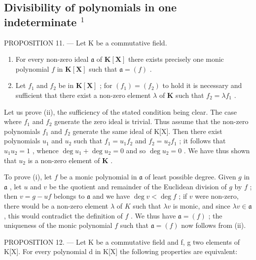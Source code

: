 \subsection{\texorpdfstring{Divisibility of polynomials in one indeterminate \(^{1}\)}{Divisibility of polynomials in one indeterminate [1]}}

PROPOSITION 11. --- Let K be a commutative field.

\begin{enumerate}
\def\labelenumi{(\roman{enumi})}
\item
  For every non-zero ideal \(\mathfrak{a}\) of \(\mathbf{K}[\mathbf{X}]\) there exists precisely one monic polynomial \(f\) in \(\mathbf{K}[\mathbf{X}]\) such that \(\mathfrak{a} = (f)\) .
\item
  Let \(f_{1}\) and \(f_{2}\) be in \(\mathbf{K}[\mathbf{X}]\) ; for \((f_{1}) = (f_{2})\) to hold it is necessary and sufficient that there exist a non-zero element \(\lambda\) of \(\mathbf{K}\) such that \(f_{2} = \lambda f_{1}\) .
\end{enumerate}

Let us prove (ii), the sufficiency of the stated condition being clear. The case where \(f_{1}\) and \(f_{2}\) generate the zero ideal is trivial. Thus assume that the non-zero polynomials \(f_{1}\) and \(f_{2}\) generate the same ideal of K{[}X{]}. Then there exist polynomials \(u_{1}\) and \(u_{2}\) such that \(f_{1}=u_{1}f_{2}\) and \(f_{2}=u_{2}f_{1}\) ; it follows that \(u_{1}u_{2} = 1\) , whence \(\deg u_{1} + \deg u_{2} = 0\) and so \(\deg u_{2} = 0\) . We have thus shown that \(u_{2}\) is a non-zero element of \(\mathbf{K}\) .

To prove (i), let \(f\) be a monic polynomial in \(\mathfrak{a}\) of least possible degree. Given \(g\) in \(\mathfrak{a}\) , let \(u\) and \(v\) be the quotient and remainder of the Euclidean division of \(g\) by \(f\) ; then \(v = g - uf\) belongs to \(\mathfrak{a}\) and we have \(\deg v < \deg f\) ; if \(v\) were non-zero, there would be a non-zero element \(\lambda\) of \(K\) such that \(\lambda v\) is monic, and since \(\lambda v \in \mathfrak{a}\) , this would contradict the definition of \(f\) . We thus have \(\mathfrak{a} = (f)\) ; the uniqueness of the monic polynomial \(f\) such that \(\mathfrak{a} = (f)\) now follows from (ii).

PROPOSITION 12. --- Let K be a commutative field and f, g two elements of K{[}X{]}. For every polynomial d in K{[}X{]} the following properties are equivalent:

